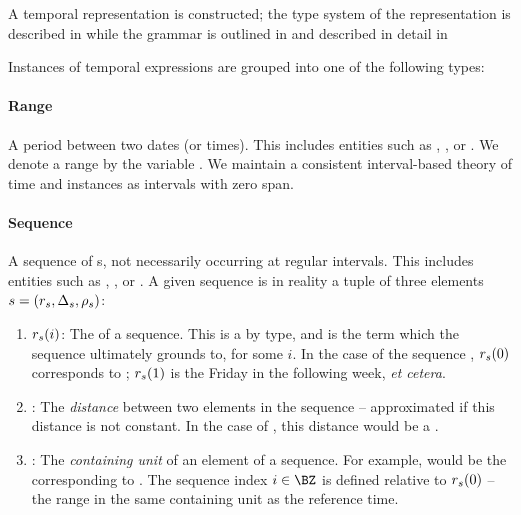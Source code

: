 A temporal representation is constructed; the type system of the representation
	is described in  while the grammar is outlined in
	 and described in detail in 

Instances of temporal expressions are grouped into one of the following types:
\paragraph{Range}
A period between two dates (or times).
This includes entities such as , , or
	.
We denote a range by the variable \range.
We maintain a consistent interval-based theory of time
	\cite{key:1981allen-temporal} and instances as intervals with
	zero span.

\paragraph{Sequence}
A sequence of s, not necessarily occurring at regular intervals.
This includes entities such as , , or
	.
A given sequence is in reality a tuple of three elements
	$s=(r_s,\Delta_s,\rho_s)$:
\begin{enumerate}
	\setlength{\itemsep}{-5pt} 
	\item $r_s(i)$: 
		The   of a sequence.
		This is a  by type, and is the term which the sequence ultimately
			grounds to, for some $i$.
		In the case of the sequence , $r_s(0)$ corresponds to
			; 
			$r_s(1)$ is the Friday in the following week, \textit{et cetera}.
	\item \seqjump:
		The \textit{distance} between two elements in the sequence -- approximated
			if this distance is not constant.
		In the case of , this distance would be a .
	\item \seqcanon:
		The \textit{containing unit} of an element of a sequence.
		For example,  would be the 
			corresponding to .
		The sequence index $i \in \BZ$ is defined relative to $r_s(0)$ --
			the range in the same containing unit as the reference time.
\end{enumerate}

